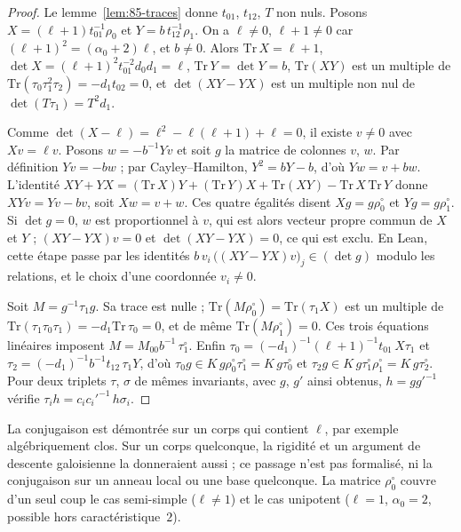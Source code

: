 \begin{proof}
Le lemme~\ref{lem:85-traces} donne $t_{01}$, $t_{12}$, $T$ non nuls. Posons $X = (\ell + 1)t_{01}^{-1}\rho_0$ et $Y = b\,t_{12}^{-1}\rho_1$. On a $\ell \neq 0$, $\ell + 1 \neq 0$ car $(\ell+1)^2 = (\alpha_0 + 2)\ell$, et $b \neq 0$. Alors $\mathrm{Tr}\,X = \ell + 1$, $\det X = (\ell+1)^2 t_{01}^{-2} d_0 d_1 = \ell$, $\mathrm{Tr}\,Y = \det Y = b$, $\mathrm{Tr}(XY)$ est un multiple de $\mathrm{Tr}(\tau_0\tau_1^2\tau_2) = -d_1 t_{02} = 0$, et $\det(XY - YX)$ est un multiple non nul de $\det(T\tau_1) = T^2 d_1$.

Comme $\det(X - \ell) = \ell^2 - \ell(\ell + 1) + \ell = 0$, il existe $v \neq 0$ avec $Xv = \ell v$. Posons $w = -b^{-1}Yv$ et soit $g$ la matrice de colonnes $v$, $w$. Par définition $Yv = -bw$ ; par Cayley--Hamilton, $Y^2 = bY - b$, d'où $Yw = v + bw$. L'identité $XY + YX = (\mathrm{Tr}\,X)Y + (\mathrm{Tr}\,Y)X + \mathrm{Tr}(XY) - \mathrm{Tr}\,X\,\mathrm{Tr}\,Y$ donne $XYv = Yv - bv$, soit $Xw = v + w$. Ces quatre égalités disent $Xg = g\rho_0^\circ$ et $Yg = g\rho_1^\circ$. Si $\det g = 0$, $w$ est proportionnel à $v$, qui est alors vecteur propre commun de $X$ et $Y$ ; $(XY - YX)v = 0$ et $\det(XY - YX) = 0$, ce qui est exclu. En Lean, cette étape passe par les identités $b\,v_i\,\big((XY - YX)v\big)_j \in (\det g)$ modulo les relations, et le choix d'une coordonnée $v_i \neq 0$.

Soit $M = g^{-1}\tau_1 g$. Sa trace est nulle ; $\mathrm{Tr}(M\rho_0^\circ) = \mathrm{Tr}(\tau_1 X)$ est un multiple de $\mathrm{Tr}(\tau_1\tau_0\tau_1) = -d_1\mathrm{Tr}\,\tau_0 = 0$, et de même $\mathrm{Tr}(M\rho_1^\circ) = 0$. Ces trois équations linéaires imposent $M = M_{00}b^{-1}\,\tau_1^\circ$. Enfin $\tau_0 = (-d_1)^{-1}(\ell+1)^{-1}t_{01}\,X\tau_1$ et $\tau_2 = (-d_1)^{-1}b^{-1}t_{12}\,\tau_1 Y$, d'où $\tau_0 g \in K\,g\rho_0^\circ\tau_1^\circ = K\,g\tau_0^\circ$ et $\tau_2 g \in K\,g\tau_1^\circ\rho_1^\circ = K\,g\tau_2^\circ$. Pour deux triplets $\tau$, $\sigma$ de mêmes invariants, avec $g$, $g'$ ainsi obtenus, $h = g g'^{-1}$ vérifie $\tau_i h = c_i c_i'^{-1}\,h\sigma_i$.
\end{proof}

\begin{remarque}
La conjugaison est démontrée sur un corps qui contient $\ell$, par exemple algébriquement clos. Sur un corps quelconque, la rigidité et un argument de descente galoisienne la donneraient aussi ; ce passage n'est pas formalisé, ni la conjugaison sur un anneau local ou une base quelconque. La matrice $\rho_0^\circ$ couvre d'un seul coup le cas semi-simple ($\ell \neq 1$) et le cas unipotent ($\ell = 1$, $\alpha_0 = 2$, possible hors caractéristique~$2$).
\end{remarque}

